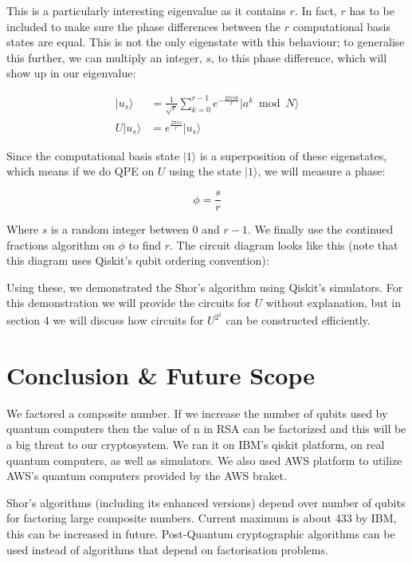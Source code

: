 \documentclass{article}
\begin{document}
This is a particularly interesting eigenvalue as it contains \(r\). In
fact, \(r\) has to be included to make sure the phase differences
between the \(r\) computational basis states are equal. This is not the
only eigenstate with this behaviour; to generalise this further, we can
multiply an integer, \(s\), to this phase difference, which will show up
in our eigenvalue:

\[\begin{aligned}
|u_s\rangle &= \tfrac{1}{\sqrt{r}}\sum_{k=0}^{r-1}{e^{-\tfrac{2\pi i s k}{r}}|a^k \bmod N\rangle}\\[10pt]
U|u_s\rangle &= e^{\tfrac{2\pi i s}{r}}|u_s\rangle 
\end{aligned}
\]

Since the computational basis state \(|1\rangle\) is a superposition of
these eigenstates, which means if we do QPE on \(U\) using the state
\(|1\rangle\), we will measure a phase:

\[\phi = \frac{s}{r}\]

Where \(s\) is a random integer between \(0\) and \(r-1\). We finally
use the continued fractions algorithm on \(\phi\) to find \(r\). The circuit diagram
looks like this (note that this diagram uses Qiskit's qubit ordering
convention):

Using these, we demonstrated the Shor's algorithm using Qiskit's simulators. For
this demonstration we will provide the circuits for \(U\) without
explanation, but in section 4 we will discuss how circuits for
\(U^{2^j}\) can be constructed efficiently.

\section{Conclusion \& Future Scope}

We factored a composite number. If we increase the number of qubits used by quantum computers then the value of n in RSA can be factorized and this will be a big threat to our cryptosystem.
We ran it on IBM’s qiskit platform, on real quantum computers, as well as simulators.
We also used AWS platform to utilize AWS’s quantum computers provided by the AWS braket.

Shor’s algorithms (including its enhanced versions) depend over number of qubits for factoring large composite numbers.
Current maximum is about 433 by IBM, this can be increased in future.
Post-Quantum cryptographic algorithms \cite{borges2020comparison} \cite{nguyen2022novel} can be used instead of algorithms that depend on factorisation problems.

\printbibliography %
\end{document}
